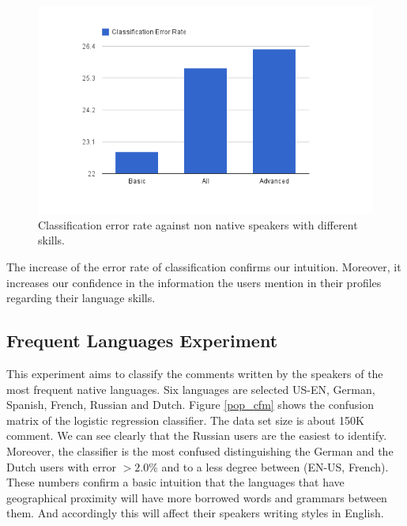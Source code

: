 \documentclass[11pt]{article}
\begin{document}
\begin{figure}[htp]
\centering
\includegraphics[scale=0.50]{fluency.png}
\caption{Classification error rate against non native speakers with different
skills.}
\label{fluency}
\end{figure}

The increase of the error rate of classification confirms our intuition.
Moreover, it increases our confidence in the information the users mention in
their profiles regarding their language skills.

\subsection{Frequent Languages Experiment}
This experiment aims to classify the comments written by the speakers of the most frequent native languages.
Six languages are selected US-EN, German, Spanish, French, Russian and Dutch.
Figure \ref{pop_cfm} shows the confusion matrix of the logistic regression
classifier. The data set size is about 150K comment. We can see clearly that the
Russian users are the easiest to identify. Moreover, the classifier is the most
confused distinguishing the German and the Dutch users with error $>2.0\%$ and
to a less degree between (EN-US, French). These numbers confirm a basic
intuition that the languages that have geographical proximity will have more
borrowed words and grammars between them. And accordingly this will affect their speakers writing styles in English.
\end{document}
